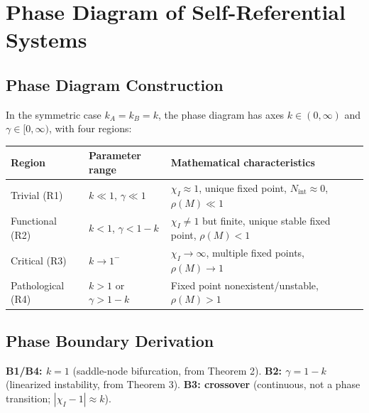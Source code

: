 \documentclass[12pt,a4paper]{article}
\theoremstyle{definition}
\newcommand{\chiI}{\chi_I}
\newcommand{\Nint}{N_{\mathrm{int}}}
\begin{document}
\section{Phase Diagram of Self-Referential Systems}
\label{sec:phase}

\subsection{Phase Diagram Construction}

In the symmetric case $k_A = k_B = k$, the phase diagram has axes $k \in (0, \infty)$ and $\gamma \in [0, \infty)$, with four regions:

\begin{longtable}{p{} p{} p{}}
\toprule
Region & Parameter range & Mathematical characteristics \\
\midrule
Trivial (R1) & $k \ll 1$, $\gamma \ll 1$ & $\chiI \approx 1$, unique fixed point, $\Nint \approx 0$, $\rho(M) \ll 1$ \\
Functional (R2) & $k < 1$, $\gamma < 1-k$ & $\chiI \neq 1$ but finite, unique stable fixed point, $\rho(M) < 1$ \\
Critical (R3) & $k \to 1^-$ & $\chiI \to \infty$, multiple fixed points, $\rho(M) \to 1$ \\
Pathological (R4) & $k > 1$ or $\gamma > 1-k$ & Fixed point nonexistent/unstable, $\rho(M) > 1$ \\
\bottomrule
\end{longtable}

\subsection{Phase Boundary Derivation}

\textbf{B1/B4: $k = 1$} (saddle-node bifurcation, from Theorem 2). \textbf{B2: $\gamma = 1 - k$} (linearized instability, from Theorem 3). \textbf{B3: crossover} (continuous, not a phase transition; $|\chiI - 1| \approx k$).
\end{document}
